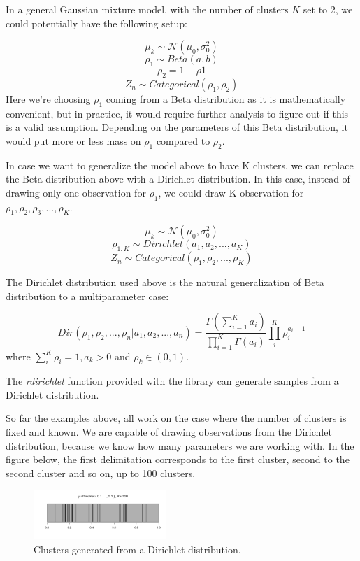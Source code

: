 \documentclass[12pt,a4paper]{article}
\begin{document}
In a general Gaussian mixture model, with the number of clusters $K$ set to 2, we could potentially have the following setup: 

$$\mu_{k} \sim \mathcal{N}(\mu_{0}, \sigma_{0}^2)$$ 
$$\rho_{1} \sim Beta(a, b)$$
$$\rho_{2} = 1 - \rho{1}$$ 
$$Z_{n} \sim Categorical(\rho_{1}, \rho_{2})$$
Here we're choosing $\rho_{1}$ coming from a Beta distribution as it is mathematically convenient, but in practice, it would require further analysis to figure out if this is a valid assumption. Depending on the parameters of this Beta distribution, it would put more or less mass on $\rho_{1}$ compared to $\rho_{2}$.

In case we want to generalize the model above to have K clusters, we can replace the Beta distribution above with a Dirichlet distribution. In this case, instead of drawing only one observation for $\rho_{1}$, we could draw K observation for $\rho_{1}, \rho_{2}, \rho_{3}, ..., \rho_{K}$.

$$\mu_{k} \sim \mathcal{N}(\mu_{0}, \sigma_{0}^2)$$ 
$$\rho_{1:K} \sim Dirichlet(a_{1}, a_{2}, ..., a_{K})$$
$$Z_{n} \sim Categorical(\rho_{1}, \rho_{2}, ... ,\rho_{K})$$

The Dirichlet distribution used above is the natural generalization of Beta distribution to a multiparameter case:

$$ Dir(\rho_{1}, \rho_{2}, ..., \rho_{n}| a_{1}, a_{2}, ..., a_{n}) = \frac{\Gamma(\sum_{i=1}^{K}a_{i})}{\prod_{i=1}^{K}\Gamma(a_{i})}\prod_{i}^{K}\rho_{i}^{a_{i} - 1}$$ where
$\sum_{i}^{K} \rho_{i} = 1, a_{k} > 0$ and $\rho_{k} \in (0, 1)$.

The \textit{rdirichlet} function provided with the library can generate samples from a Dirichlet distribution.

So far the examples above, all work on the case where the number of clusters is fixed and known. We are capable of drawing observations from the Dirichlet distribution, because we know how many parameters we are working with. In the figure below, the first delimitation corresponds to the first cluster, second to the second cluster and so on, up to 100 clusters.

\begin{figure} [H]
    \begin{center}
        \includegraphics[scale=1, width=5cm]{stacked_dirichlet.png}
        \caption{Clusters generated from a Dirichlet distribution.}
        \label{fig:stacked_dirichlet}
    \end{center}
\end{figure}
\end{document}
